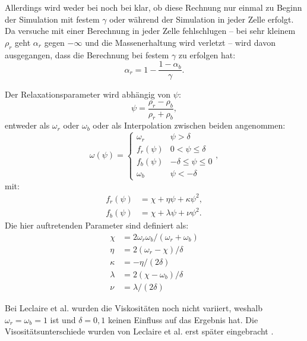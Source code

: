 \documentclass[a4paper,10pt]{scrreprt}
\begin{document}
Allerdings wird weder bei \cite{Reis2007} noch bei \cite{Leclaire2011} klar, ob diese Rechnung nur einmal zu Beginn der Simulation mit festem $\gamma$ oder während der Simulation in jeder Zelle erfolgt. 
Da versuche mit einer Berechnung in jeder Zelle fehlschlugen -- bei sehr kleinem $\rho_r$ geht $\alpha_r$ gegen $- \infty$ und die Massenerhaltung wird verletzt -- wird davon ausgegangen, dass die Berechnung bei festem $\gamma$ zu erfolgen hat:
\begin{equation}
 \alpha_r = 1 - \frac{1 - \alpha_b}{\gamma}.
\end{equation}


Der Relaxationsparameter wird abhängig von $\psi$:
\begin{equation}
 \psi = \frac{\rho_r - \rho_b}{\rho_r + \rho_b},
\end{equation}
 entweder als $\omega_r$ oder $\omega_b$ oder als Interpolation zwischen beiden angenommen:
\begin{equation}
 \omega(\psi) = \left\lbrace 
\begin{array}{ll}
  \omega_r & \psi > \delta \\
  f_r(\psi) &   0 < \psi \leq \delta \\
  f_b(\psi) & -\delta \leq \psi \leq 0 \\
  \omega_b & \psi < -\delta
\end{array} \right. ,
\end{equation}
mit:
\begin{align}
 f_r(\psi) &= \chi + \eta \psi + \kappa \psi^2 , \\
 f_b(\psi) &= \chi + \lambda \psi + \nu \psi^2 .
\end{align}
Die hier auftretenden Parameter sind definiert als:
\begin{align}
 \chi &= 2 \omega_r \omega_b / (\omega_r + \omega_b) \\
 \eta &= 2(\omega_r - \chi)/\delta \\
 \kappa &= -\eta / (2 \delta) \\
 \lambda &= 2(\chi - \omega_b) / \delta \\
 \nu &= \lambda / (2 \delta)
\end{align}

Bei Leclaire et al.  wurden die Viskositäten noch nicht variiert, weshalb $\omega_r = \omega_b = 1$ ist und $\delta = 0,1$ keinen Einfluss auf das Ergebnis hat. 
Die Visositätsunterschiede wurden von Leclaire et al. erst später eingebracht \cite{Leclaire2012}.
\end{document}
